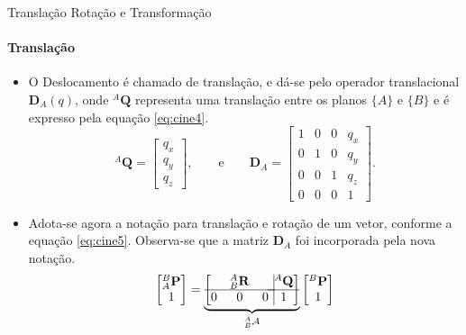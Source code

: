 \documentclass{beamer}
\begin{document}
\begin{frame}{Translação Rotação e Transformação}
    \framesubtitle{Translação}
    \begin{itemize}
        \item O Deslocamento é chamado de translação, e dá-se pelo operador translacional $\mathbf{D}_A(q)$, onde ${}^A\mathbf{Q}$ representa uma translação entre os planos $\{A\}$ e $\{B\}$ e é expresso pela equação \eqref{eq:cine4}.
        \begin{equation}\label{eq:cine4}
        {}^A\mathbf{Q} =
        \begin{bmatrix}
        q_x\\ q_y \\ q_z
        \end{bmatrix}, \qquad \mathrm{e} \qquad
        \mathbf{D}_A = 
        \begin{bmatrix}
        1 & 0 & 0 & q_x\\
        0 & 1 & 0 & q_y\\
        0 & 0 & 1 & q_z\\
        0 & 0 & 0 & 1
        \end{bmatrix}.
        \end{equation}
    \item Adota-se agora a notação para translação e rotação de um vetor, conforme a equação \eqref{eq:cine5}. Observa-se que a matriz $\mathbf{D}_A$ foi incorporada pela nova notação.
        \begin{equation}\label{eq:cine5}
        \begin{bmatrix}
        {}^B_A\mathbf{P}\\ 1
        \end{bmatrix}
        =
        \underbrace {
        \left[
        \begin{matrix}
        & {}_B^A\mathbf{R}& \\ \hline
        0 & 0 & 0\\
        \end{matrix} \right.
        \left.
        \vline
        \begin{matrix}
        {}^A\mathbf{Q}\\ \hline
        1
        \end{matrix} \right]
        }_{{}^A_B\mathcal{A}}
        \begin{bmatrix}
        {}^B\mathbf{P}\\
        1
        \end{bmatrix}
        \end{equation}
    \end{itemize}
\end{frame}
\end{document}
